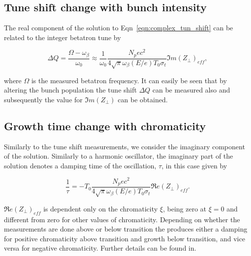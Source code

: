 \subsection{Tune shift change with bunch intensity}
\label{sec:tune-shift-bunch-int}

The real component of the solution to Eqn~\ref{eqn:complex_tun_shift} can be related to the integer betatron tune by

\begin{equation}
\Delta Q = \frac{\Omega - \omega_{\beta}}{\omega_{0}} \approx \frac{1}{\omega_{0}} \frac{N_{p}ec^{2}}{4\sqrt{\pi}\omega_{\beta} \left( E/e \right)T_{0}\sigma_{t}} \Im{}m\left(  Z_{\perp} \right)_{eff},
\end{equation} 

where $\Omega$ is the measured betatron frequency. It can easily be seen that by altering the bunch population the tune shift $\Delta Q$ can be measured also and subsequently the value for $\Im{}m\left(  Z_{\perp} \right)$ can be obtained.

\subsection{Growth time change with chromaticity}
\label{sec:growth-time-chrom}

Similarly to the tune shift measurements, we consider the imaginary component of the solution. Similarly to a harmonic oscillator, the imaginary part of the solution denotes a damping time of the oscillation, $\tau$, in this case given by

\begin{equation}
\frac{1}{\tau} = -T_{0} \frac{N_{p}ec^{2}}{4\sqrt{\pi}\omega_{\beta} \left( E/e \right)T_{0}\sigma_{t}} \Re{}e\left(  Z_{\perp} \right)_{eff}.
\end{equation}

$\Re{}e\left(  Z_{\perp} \right)_{eff}$ is dependent only on the chromaticity $\xi$, being zero at $\xi = 0$ and different from zero for other values of chromaticity. Depending on whether the measurements are done above or below transition the produces either a damping for positive chromaticity above transition and growth below transition, and vice versa for negative chromaticity. Further details can be found in.